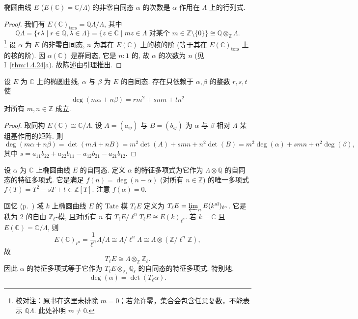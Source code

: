 \begin{proposition} \label{thm:3.3.21} 
椭圆曲线 $E$ ($E(\mathbb{C}) = \mathbb{C}/\Lambda$) 的非零自同态 $\alpha$ 的次数是 $\alpha$ 作用在 $\Lambda$ 上的行列式.
\end{proposition}

\begin{proof}
我们有 $E(\mathbb{C})_{\mathrm{tors}} = \mathbb{Q}\Lambda/\Lambda$, 其中
\[
\mathbb{Q}\Lambda = \{r\lambda \mid r\in\mathbb{Q}, \lambda\in\Lambda\} = \{z\in\mathbb{C} \mid mz\in\Lambda \text{ 对某个 } m\in\mathbb{Z}\setminus\{0\}\} \cong \mathbb{Q}\otimes_{\mathbb{Z}}\Lambda.
\]
\footnote{校对注：原书在这里未排除 $m=0$；若允许零，集合会包含任意复数，不能表示 $\mathbb{Q}\Lambda$. 此处补明 $m\neq 0$.} 设 $\alpha$ 为 $E$ 的非零自同态, $n$ 为其在 $E(\mathbb{C})$ 上的核的阶 (等于其在 $E(\mathbb{C})_{\mathrm{tors}}$ 上的核的阶). 因 $\alpha(\mathbb{C})$ 是群同态, 它是 $n:1$ 的, 故 $\alpha$ 的次数为 $n$ (见I~\ref{thm:1.4.24}a). 故陈述由引理推出.
\end{proof}

\begin{theorem} \label{thm:3.3.22} 
设 $E$ 为 $\mathbb{C}$ 上的椭圆曲线, $\alpha$ 与 $\beta$ 为 $E$ 的自同态. 存在只依赖于 $\alpha, \beta$ 的整数 $r, s, t$ 使
\[
\deg(m\alpha + n\beta) = rm^2 + smn + tn^2
\]
对所有 $m, n\in\mathbb{Z}$ 成立.
\end{theorem}

\begin{proof}
取同构 $E(\mathbb{C})\cong\mathbb{C}/\Lambda$, 设 $A = (a_{ij})$ 与 $B = (b_{ij})$ 为 $\alpha$ 与 $\beta$ 相对 $\Lambda$ 某组基作用的矩阵. 则
\[
\deg(m\alpha + n\beta) = \det(mA + nB) = m^2\det(A) + smn + n^2\det(B) = m^2\deg(\alpha) + smn + n^2\deg(\beta),
\]
其中 $s = a_{11}b_{22} + a_{22}b_{11} - a_{12}b_{21} - a_{21}b_{12}$.
\end{proof}

设 $\alpha$ 为 $\mathbb{C}$ 上椭圆曲线 $E$ 的自同态. 定义 $\alpha$ 的特征多项式为它作为 $\Lambda\otimes\mathbb{Q}$ 的自同态的特征多项式. 它是满足 $f(n) = \deg(n-\alpha)$ (对所有 $n\in\mathbb{Z}$) 的唯一多项式 $f(T) = T^2 - sT + t\in\mathbb{Z}[T]$. 注意 $f(\alpha) = 0$.

回忆 (p.~\pageref{pg:tate-module}) 域 $k$ 上椭圆曲线 $E$ 的 Tate 模 $T_\ell E$ 定义为 $T_\ell E = \varprojlim_n E(k^{\mathrm{al}})_{\ell^n}$. 它是秩为 $2$ 的自由 $\mathbb{Z}_\ell$-模, 且对所有 $n$ 有 $T_\ell E/\ell^nT_\ell E\cong E(k)_{\ell^n}$. 若 $k = \mathbb{C}$ 且 $E(\mathbb{C}) = \mathbb{C}/\Lambda$, 则
\[
E(\mathbb{C})_{\ell^n} = \frac{1}{\ell^n}\Lambda/\Lambda\cong\Lambda/\ell^n\Lambda\cong\Lambda\otimes(\mathbb{Z}/\ell^n\mathbb{Z}),
\]
故
\[
T_\ell E\cong\Lambda\otimes_{\mathbb{Z}}\mathbb{Z}_\ell.
\]
因此 $\alpha$ 的特征多项式等于它作为 $T_\ell E\otimes_{\mathbb{Z}_\ell}\mathbb{Q}_\ell$ 的自同态的特征多项式. 特别地,
\[
\deg(\alpha) = \det(T_\ell\alpha).
\]

